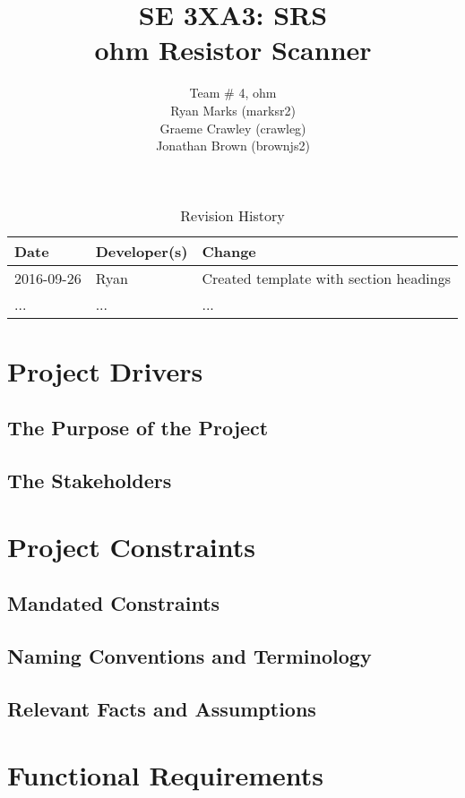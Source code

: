 \documentclass{article}
\title{SE 3XA3: SRS\\ohm Resistor Scanner}
\author{Team \# 4, ohm
		\\ Ryan Marks (marksr2)
		\\ Graeme Crawley (crawleg)
		\\ Jonathan Brown (brownjs2)
}
\date{}
\begin{document}
\begin{table}[hp]
\caption{Revision History} \label{TblRevisionHistory}
\begin{tabularx}{\textwidth}{llX}
\toprule
\textbf{Date} & \textbf{Developer(s)} & \textbf{Change}\\
\midrule
2016-09-26 & Ryan & Created template with section headings\\
... & ... & ...\\
\bottomrule
\end{tabularx}
\end{table}

\newpage

\maketitle



\section{Project Drivers}

\subsection{The Purpose of the Project }
\subsection{The Stakeholders}


\section{Project Constraints}

\subsection{Mandated Constraints}
\subsection{Naming Conventions and Terminology }
\subsection{Relevant Facts and Assumptions}


\section{Functional Requirements}
\end{document}
